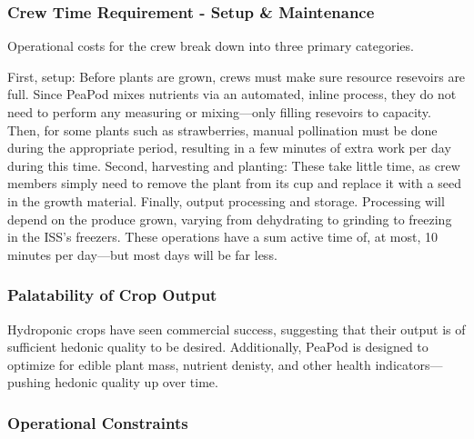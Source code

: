 \documentclass{report}
\begin{document}

\subsubsection{Crew Time Requirement - Setup \& Maintenance}
\label{sec:constraints-crewtime} 
Operational costs for the crew break down into three primary categories.

First, setup: Before plants are grown, crews must make sure resource resevoirs are full. Since PeaPod mixes nutrients via an automated, inline process, they do not need to perform any measuring or mixing---only filling resevoirs to capacity. Then, for some plants such as strawberries, manual pollination must be done during the appropriate period, resulting in a few minutes of extra work per day during this time. Second, harvesting and planting: These take little time, as crew members simply need to remove the plant from its cup and replace it with a seed in the growth material. Finally, output processing and storage. Processing will depend on the produce grown, varying from dehydrating to grinding to freezing in the ISS's freezers. These operations have a sum active time of, at most, 10 minutes per day---but most days will be far less.



\subsubsection{Palatability of Crop Output} 
\label{sec:constraints-palatability}




Hydroponic crops have seen commercial success, suggesting that their output is of sufficient hedonic quality to be desired. Additionally, PeaPod is designed to optimize for edible plant mass, nutrient denisty, and other health indicators---pushing hedonic quality up over time.

\subsubsection{Operational Constraints} 
\label{sec:constraints-operational}
\end{document}

